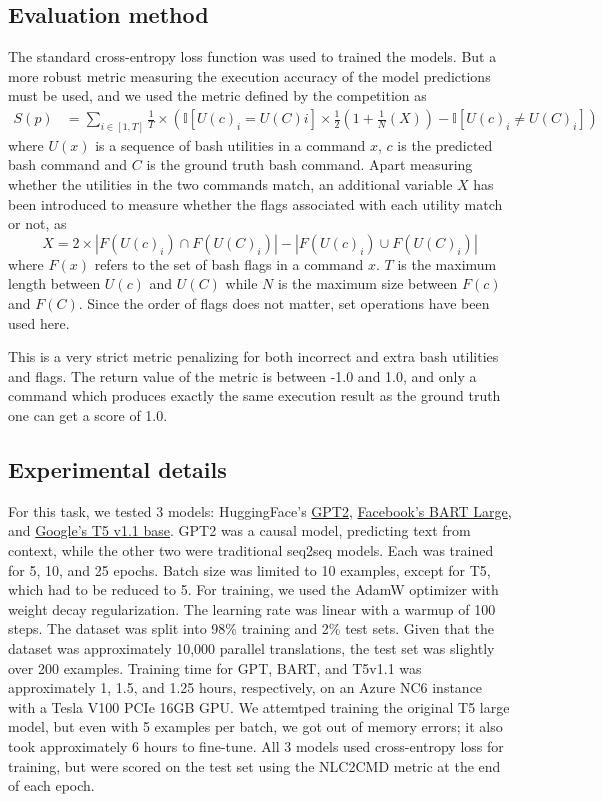 \documentclass{article}
\begin{document}
\subsection{Evaluation method}
The standard cross-entropy loss function was used to trained the models. But a
more robust metric measuring the execution accuracy of the model predictions
must be used, and we used the metric defined by the competition as
\begin{align*}
	S(p) & =\sum_{i\in[1,T]}\frac{1}{T}\times\left(
	\mathbb{I}[U(c)_i=U(C)i]\times\frac{1}{2}\left(
		1+\frac{1}{N}\left(X\right)\right) -\mathbb{I}[U(c)_i\ne U(C)_i]
	\right)
\end{align*}
where $U(x)$ is a sequence of bash utilities in a command $x$, $c$ is the
predicted bash command and $C$ is the ground truth bash command. Apart
measuring whether the utilities in the two commands match, an additional
variable $X$ has been introduced to measure whether the flags associated with
each utility match or not, as
\begin{equation*}
	X = 2\times
	|F(U(c)_i)\cap F(U(C)_i)| - |F(U(c)_i)\cup F(U(C)_i)|
\end{equation*}
where $F(x)$ refers to the set of bash flags in a command $x$. $T$ is the
maximum length between $U(c)$ and $U(C)$ while $N$ is the maximum size between
$F(c)$ and $F(C)$. Since the order of flags does not matter, set operations
have been used here.

This is a very strict metric penalizing for both incorrect and extra bash
utilities and flags. The return value of the metric is between -1.0 and 1.0,
and only a command which produces exactly the same execution result as the
ground truth one can get a score of 1.0.

\subsection{Experimental details}
For this task, we tested 3 models: HuggingFace's
\href{https://huggingface.co/gpt2}{GPT2}\cite{gpt2},
\href{https://huggingface.co/facebook/bart-large}{Facebook's BART
	Large}\cite{bart}, and \href{https://huggingface.co/google/t5-v1_1-base}{Google's T5 v1.1
	base}. GPT2 was a causal model, predicting text from context, while the other
two were traditional seq2seq models. Each was trained for 5, 10, and 25
epochs. Batch size was limited to 10 examples, except for T5, which had to be
reduced to 5. For training, we used the AdamW optimizer with weight decay
regularization. The learning rate was linear with a warmup of 100 steps. The
dataset was split into 98\% training and 2\% test sets. Given that the
dataset was approximately 10,000 parallel translations, the test set was
slightly over 200 examples. Training time for GPT, BART, and T5v1.1 was
approximately 1, 1.5, and 1.25 hours, respectively, on an Azure NC6 instance
with a Tesla V100 PCIe 16GB GPU. We attemtped training the original T5 large
model, but even with 5 examples per batch, we got out of memory errors;
it also took approximately 6 hours to fine-tune. All 3 models used cross-entropy
loss for training, but were scored on the test set using the NLC2CMD metric
at the end of each epoch.
\end{document}
